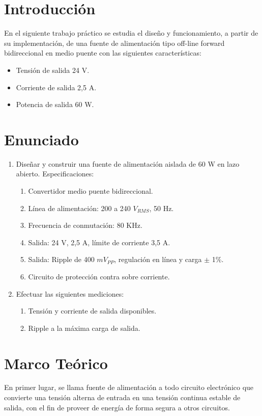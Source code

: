 \documentclass[11pt, a4paper]{article}
\begin{document}
	
	\tableofcontents


\section{Introducción}
En el siguiente trabajo práctico se estudia el diseño y funcionamiento, a partir de su implementación, de una fuente de alimentación tipo off-line forward bidireccional en medio puente con las siguientes características:
\begin{itemize}
	\item Tensión de salida 24 V.
	\item Corriente de salida 2,5 A.
	\item Potencia de salida 60 W.
\end{itemize}

\section{Enunciado}
\begin{enumerate}
	\item Diseñar y construir una fuente de alimentación aislada de 60 W en lazo abierto. Especificaciones:
		\begin{enumerate}
			\item Convertidor medio puente bidireccional.
			\item Línea de alimentación: 200 a 240 $V_{RMS}$, 50 Hz.
			\item Frecuencia de conmutación: 80 KHz.
			\item Salida: 24 V, 2,5 A, límite de corriente 3,5 A.
			\item Salida: Ripple de 400 $mV_{PP}$, regulación en línea y carga $\pm$ 1\%.
			\item Circuito de protección contra sobre corriente. 
		\end{enumerate}
	\item Efectuar las siguientes mediciones:
		\begin{enumerate}
			\item Tensión y corriente de salida disponibles.
			\item Ripple a la máxima carga de salida.
		\end{enumerate}
\end{enumerate}


\section{Marco Teórico}
En primer lugar, se llama fuente de alimentación a todo circuito electrónico que convierte una tensión alterna de entrada en una tensión continua estable de salida, con el fin de proveer de energía de forma segura a otros circuitos.
\end{document}
